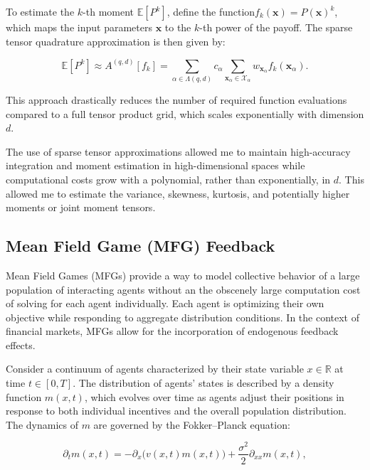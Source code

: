 \documentclass[titlepage]{article}
\begin{document}
To estimate the \(k\)-th moment \(\mathbb{E}[P^k]\), define the function\(f_k(\mathbf{x}) = P(\mathbf{x})^k\), which maps the input parameters \(\mathbf{x}\) to the \(k\)-th power of the payoff. The sparse tensor quadrature approximation is then given by:

\begin{equation}
\mathbb{E}[P^k] \approx A^{(q,d)}[f_k] = \sum_{\alpha \in \Lambda(q,d)} c_\alpha \sum_{\mathbf{x}_\alpha \in \mathcal{X}_\alpha} w_{\mathbf{x}_\alpha} f_k(\mathbf{x}_\alpha).
\label{eq:moment_sparse_approx}
\end{equation}

This approach drastically reduces the number of required function evaluations compared to a full tensor product grid, which scales exponentially with dimension \(d\).

The use of sparse tensor approximations allowed me to maintain high-accuracy integration and moment estimation in high-dimensional spaces while computational costs grow with a polynomial, rather than exponentially, in \(d\). This allowed me to estimate the variance, skewness, kurtosis, and potentially higher moments or joint moment tensors.

\subsection{Mean Field Game (MFG) Feedback}

Mean Field Games (MFGs) provide a way to model collective behavior of a large population of interacting agents without an the obscenely large computation cost of solving for each agent individually. Each agent is optimizing their own objective while responding to aggregate distribution conditions. In the context of financial markets, MFGs allow for the incorporation of endogenous feedback effects.

Consider a continuum of agents characterized by their state variable \(x \in \mathbb{R}\) at time \(t \in [0,T]\). The distribution of agents’ states is described by a density function \(m(x,t)\), which evolves over time as agents adjust their positions in response to both individual incentives and the overall population distribution. The dynamics of \(m\) are governed by the Fokker–Planck equation:

\begin{equation}
\partial_t m(x,t) = -\partial_x \big( v(x,t) m(x,t) \big) + \frac{\sigma^2}{2} \partial_{xx} m(x,t),
\label{eq:fp}
\end{equation}
\end{document}
